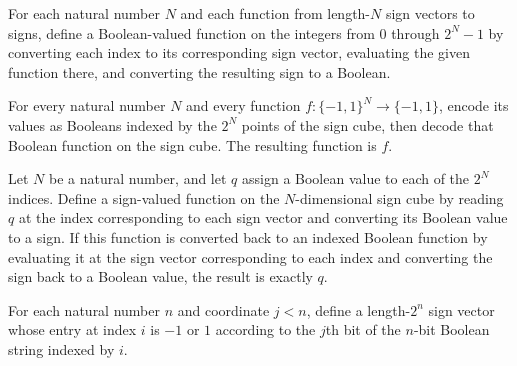\begin{definition}
\label{FABL.encodeBooleanFunctionProof}
\leanok
{}
For each natural number $N$ and each function from length-$N$ sign vectors to signs,
define a Boolean-valued function on the integers from $0$ through $2^N-1$ by converting
each index to its corresponding sign vector, evaluating the given function there, and
converting the resulting sign to a Boolean.
\end{definition}

\begin{theorem}
\label{FABL.pcppProofFunction_encodeBooleanFunctionProof}
\leanok
{}
For every natural number $N$ and every function $f:\{ -1,1\}^N\to\{ -1,1\}$, encode its
values as Booleans indexed by the $2^N$ points of the sign cube, then decode that
Boolean function on the sign cube. The resulting function is $f$.
\end{theorem}

\begin{theorem}
\label{FABL.encodeBooleanFunctionProof_pcppProofFunction}
\leanok
{}
Let $N$ be a natural number, and let $q$ assign a Boolean value to each of the $2^N$
indices. Define a sign-valued function on the $N$-dimensional sign cube by reading $q$
at the index corresponding to each sign vector and converting its Boolean value to a
sign. If this function is converted back to an indexed Boolean function by evaluating it
at the sign vector corresponding to each index and converting the sign back to a Boolean
value, the result is exactly $q$.
\end{theorem}

\begin{definition}
\label{FABL.coordinateTruthTable}
\leanok
{}
For each natural number $n$ and coordinate $j<n$, define a length-$2^n$ sign vector
whose entry at index $i$ is $-1$ or $1$ according to the $j$th bit of the $n$-bit
Boolean string indexed by $i$.
\end{definition}

